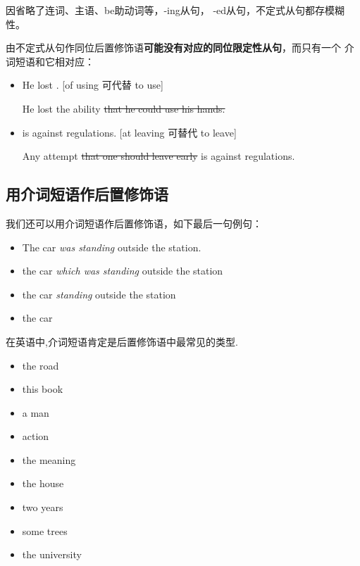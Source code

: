 因省略了连词、主语、be助动词等，-ing从句， -ed从句，不定式从句都存模糊性。

由不定式从句作同位后置修饰语\textbf{可能没有对应的同位限定性从句}，而只有一个
介词短语和它相对应：
\begin{itemize}
\item He lost  . [of using 可代替 to use]

  He lost the ability \sout{that he could use his hands.}

\item {}  is against regulations. [at
  leaving 可替代 to leave]

  Any attempt \sout{that one should leave early} is against regulations.
\end{itemize}


\subsection{用介词短语作后置修饰语}

我们还可以用介词短语作后置修饰语，如下最后一句例句：
\begin{itemize}
\item The car \emph{was standing} outside the station.
\item the car \emph{which was standing} outside the station
\item the car \emph{standing} outside the station
\item the car 
\end{itemize}

在英语中,介词短语肯定是后置修饰语中最常见的类型.

\begin{itemize}
\item the road 
\item this book 
\item a man 
\item action 
\item the meaning 
\item the house 
\item two years 
\item some trees 
\item the university 
\end{itemize}

